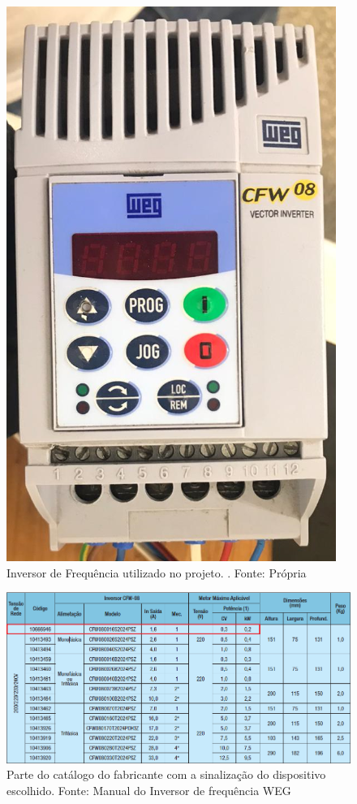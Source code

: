 \documentclass[a4paper, 12pt,oneside, english, brazil]{abntex2}
\begin{document}
\begin{figure}[H]
    \centering
    \includegraphics[scale=0.6]{inver.png}
    \caption{Inversor de Frequência utilizado no projeto.
. Fonte: Própria}
    \label{inver}
\end{figure}


\begin{figure}[H]
    \centering
    \includegraphics[scale=0.5]{catalogo.png}
    \caption{Parte do catálogo do fabricante com a sinalização do dispositivo escolhido. Fonte: Manual do Inversor de frequência WEG}
    \label{cat}
\end{figure}
\end{document}
